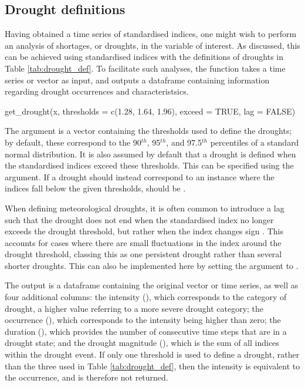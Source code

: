 \documentclass[article,shortnames,nojss]{jss}\usepackage[]{graphicx}\usepackage[]{xcolor}
\begin{document}
\subsection{Drought definitions}

Having obtained a time series of standardised indices, one might wish to perform an analysis of shortages, or droughts, in the variable of interest. As discussed, this can be achieved using standardised indices with the definitions of droughts in Table \ref{tab:drought_def}. To facilitate such analyses, the  function takes a time series or vector  as input, and outputs a dataframe containing information regarding drought occurrences and characteristsics.

\begin{Code}
get_drought(x, thresholds = c(1.28, 1.64, 1.96), exceed = TRUE, lag = FALSE)
\end{Code}


The argument  is a vector containing the thresholds used to define the droughts; by default, these correspond to the 90$^{th}$, 95$^{th}$, and 97.5$^{th}$ percentiles of a standard normal distribution. It is also assumed by default that a drought is defined when the standardised indices exceed these thresholds. This can be specified using the  argument. If a drought should instead correspond to an instance where the indices fall below the given thresholds,  should be .

When defining meteorological droughts, it is often common to introduce a lag such that the drought does not end when the standardised index no longer exceeds the drought threshold, but rather when the index changes sign \citep[e.g.][]{McKeeEtAl1993}. This accounts for cases where there are small fluctuations in the index around the drought threshold, classing this as one persistent drought rather than several shorter droughts. This can also be implemented here by setting the  argument to .

The output is a dataframe containing the original vector or time series, as well as four additional columns: the intensity (), which corresponds to the category of drought, a higher value referring to a more severe drought category; the occurrence (), which corresponds to the intensity being higher than zero; the duration (), which provides the number of consecutive time steps that are in a drought state; and the drought magnitude (), which is the sum of all indices within the drought event. If only one threshold is used to define a drought, rather than the three used in Table \ref{tab:drought_def}, then the intensity is equivalent to the occurrence, and is therefore not returned.
\end{document}
